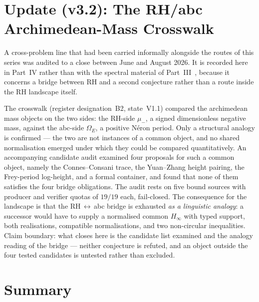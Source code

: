 \documentclass[12pt,a4paper]{article}
\theoremstyle{definition}
\theoremstyle{remark}
\begin{document}
\section{Update (v3.2): The RH/abc Archimedean-Mass Crosswalk}
\label{sec:v32-abc}

A cross-problem line that had been carried informally alongside the routes
of this series was audited to a close between June and August 2026. It is
recorded here in Part~IV rather than with the spectral material of
Part~III~\cite{Geiger2026partIII}, because it concerns a bridge between RH
and a second conjecture rather than a route inside the RH landscape
itself.

The crosswalk (register designation~B2, state~V1.1) compared the
archimedean mass objects on the two sides: the RH-side $\mu_-$, a signed
dimensionless negative mass, against the abc-side $\Omega_E$, a positive
N\'eron period. Only a structural analogy is confirmed --- the two are not
instances of a common object, and no shared normalisation emerged under
which they could be compared quantitatively. An accompanying candidate
audit examined four proposals for such a common object, namely the
Connes--Consani trace, the Yuan--Zhang height pairing, the Frey-period
log-height, and a formal container, and found that none of them satisfies
the four bridge obligations. The audit rests on five bound sources with
producer and verifier quotas of $19/19$ each, fail-closed. The consequence
for the landscape is that the RH\,$\leftrightarrow$\,abc bridge is
exhausted \emph{as a linguistic analogy}: a successor would have to supply
a normalised common $H_\infty$ with typed support, both realisations,
compatible normalisations, and two non-circular inequalities. Claim
boundary: what closes here is the candidate list examined and the analogy
reading of the bridge --- neither conjecture is refuted, and an object
outside the four tested candidates is untested rather than excluded.


\section{Summary}
\label{sec:summary}
\end{document}
